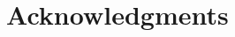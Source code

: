 \documentclass[epsfig,12pt]{article}
\begin{document}
\section*{Acknowledgments}

\small
\begin{thebibliography}{99}
\itemsep -2pt

\end{thebibliography}
\end{document}
